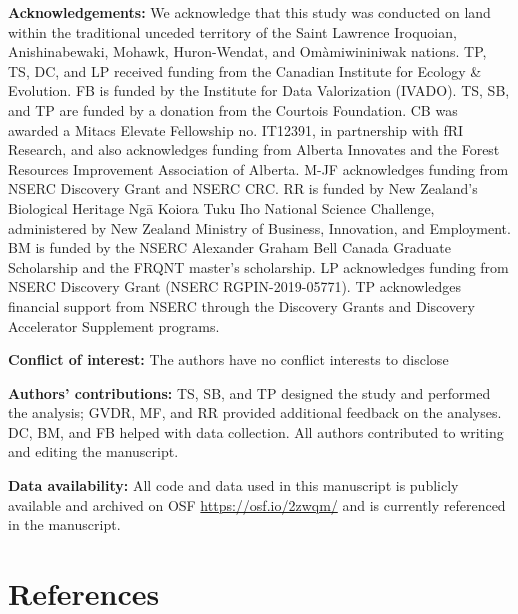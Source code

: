 \documentclass[11pt]{article}
\begin{document}
\textbf{Acknowledgements:} We acknowledge that this study was conducted
on land within the traditional unceded territory of the Saint Lawrence
Iroquoian, Anishinabewaki, Mohawk, Huron-Wendat, and Omàmiwininiwak
nations. TP, TS, DC, and LP received funding from the Canadian Institute
for Ecology \& Evolution. FB is funded by the Institute for Data
Valorization (IVADO). TS, SB, and TP are funded by a donation from the
Courtois Foundation. CB was awarded a Mitacs Elevate Fellowship no.
IT12391, in partnership with fRI Research, and also acknowledges funding
from Alberta Innovates and the Forest Resources Improvement Association
of Alberta. M-JF acknowledges funding from NSERC Discovery Grant and
NSERC CRC. RR is funded by New Zealand's Biological Heritage Ngā Koiora
Tuku Iho National Science Challenge, administered by New Zealand
Ministry of Business, Innovation, and Employment. BM is funded by the
NSERC Alexander Graham Bell Canada Graduate Scholarship and the FRQNT
master's scholarship. LP acknowledges funding from NSERC Discovery Grant
(NSERC RGPIN-2019-05771). TP acknowledges financial support from NSERC
through the Discovery Grants and Discovery Accelerator Supplement
programs.

\textbf{Conflict of interest:} The authors have no conflict interests to
disclose

\textbf{Authors' contributions:} TS, SB, and TP designed the study and
performed the analysis; GVDR, MF, and RR provided additional feedback on
the analyses. DC, BM, and FB helped with data collection. All authors
contributed to writing and editing the manuscript.

\textbf{Data availability:} All code and data used in this manuscript is
publicly available and archived on OSF \url{https://osf.io/2zwqm/} and
is currently referenced in the manuscript.

\hypertarget{references}{%
\section*{References}\label{references}}
\end{document}
